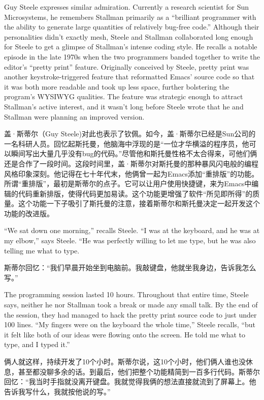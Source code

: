 \ifdefined\eng
Guy Steele expresses similar admiration. Currently a research scientist for Sun Microsystems, he remembers Stallman primarily as a ``brilliant programmer with the ability to generate large quantities of relatively bug-free code.'' Although their personalities didn't exactly mesh, Steele and Stallman collaborated long enough for Steele to get a glimpse of Stallman's intense coding style. He recalls a notable episode in the late 1970s when the two programmers banded together to write the editor's ``pretty print'' feature. Originally conceived by Steele, pretty print was another keystroke-triggered feature that reformatted Emacs' source code so that it was both more readable and took up less space, further bolstering the program's WYSIWYG qualities. The feature was strategic enough to attract Stallman's active interest, and it wasn't long before Steele wrote that he and Stallman were planning an improved version.
\fi

\ifdefined\chs
盖·斯蒂尔（Guy Steele)对此也表示了钦佩。如今，盖·斯蒂尔已经是Sun公司的一名科研人员。回忆起斯托曼，他脑海中浮现的是``一位才华横溢的程序员，他可以瞬间写出大量几乎没有bug的代码。''尽管他和斯托曼性格不太合得来，可他们俩还是合作了一段时间。这段时间里，盖·斯蒂尔对斯托曼的那种暴风闪电般的编程风格印象深刻。他记得在七十年代末，他俩曾一起为Emacs添加``重排版''的功能。所谓``重排版''，最初是斯蒂尔的点子。它可以让用户使用快捷键，来为Emacs中编辑的代码重新排版，使得代码更加易读。这个功能更增强了软件``所见即所得''的质量。这个功能一下子吸引了斯托曼的注意，接着斯蒂尔和斯托曼决定一起开发这个功能的改进版。
\fi

\ifdefined\eng
``We sat down one morning,'' recalls Steele. ``I was at the keyboard, and he was at my elbow,'' says Steele. ``He was perfectly willing to let me type, but he was also telling me what to type.
\fi

\ifdefined\chs
斯蒂尔回忆：``我们早晨开始坐到电脑前。我敲键盘，他就坐我身边，告诉我怎么写。''
\fi

\ifdefined\eng
The programming session lasted 10 hours. Throughout that entire time, Steele says, neither he nor Stallman took a break or made any small talk. By the end of the session, they had managed to hack the pretty print source code to just under 100 lines. ``My fingers were on the keyboard the whole time,'' Steele recalls, ``but it felt like both of our ideas were flowing onto the screen. He told me what to type, and I typed it.''
\fi

\ifdefined\chs
俩人就这样，持续开发了10个小时。斯蒂尔说，这10个小时，他们俩人谁也没休息，甚至都没聊多余的话。到最后，他们把整个功能精简到一百多行代码。斯蒂尔回忆：``我当时手指就没离开键盘。我就觉得我俩的想法直接就流到了屏幕上。他告诉我写什么，我就按他说的写。''
\fi

